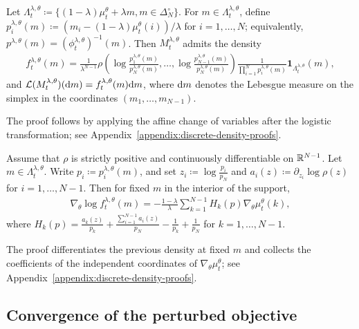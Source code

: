 \begin{proposition}
    Let $\Lambda_t^{\lambda,\theta}\coloneqq \{(1-\lambda)\mu_t^\theta+\lambda m, m\in\Delta_N^\circ\}$. For $m\in\Lambda_t^{\lambda,\theta}$, define $p_i^{\lambda,\theta}(m)\coloneqq (m_i - (1-\lambda)\mu_t^\theta(i))/\lambda$ for $i=1,\ldots,N$; equivalently, $p^{\lambda,\theta}(m)=(\phi_t^{\lambda,\theta})^{-1}(m)$. Then $M_t^{\lambda,\theta}$ admits the density
    \begin{align}
        f_t^{\lambda,\theta}(m)
        = \frac{1}{\lambda^{N-1}}
        \rho\left(\log\frac{p_1^{\lambda,\theta}(m)}{p_N^{\lambda,\theta}(m)},\ldots,\log\frac{p_{N-1}^{\lambda,\theta}(m)}{p_N^{\lambda,\theta}(m)} \right)
        \frac{1}{\prod_{i=1}^N p_i^{\lambda,\theta}(m)}
        \mathbf 1_{\Lambda_t^{\lambda,\theta}}(m),
    \end{align}
    and ${\cal L}(M_t^{\lambda,\theta})(\mathrm{d} m) = f_t^{\lambda,\theta}(m)\mathrm{d} m$, where $\mathrm{d} m$ denotes the Lebesgue measure on the simplex in the coordinates $(m_1,\ldots,m_{N-1})$.
\end{proposition}

The proof follows by applying the affine change of variables after the logistic transformation; see Appendix~\ref{appendix:discrete-density-proofs}.

\begin{corollary}
    \label{corollary:discrete-score-density}
    Assume that $\rho$ is strictly positive and continuously differentiable on $\mathbb{R}^{N-1}$. Let $m\in\Lambda_t^{\lambda,\theta}$. Write $p_i\coloneqq p_i^{\lambda,\theta}(m)$, and set $z_i\coloneqq \log\frac{p_i}{p_N}$ and $a_i(z)\coloneqq\partial_{z_i}\log\rho(z)$ for $i=1,\ldots,N-1$. Then for fixed $m$ in the interior of the support,
    \begin{align}
        \nabla_\theta \log f_t^{\lambda,\theta}(m) = -\frac{1-\lambda}{\lambda}\sum_{k=1}^{N-1} H_k(p) \nabla_\theta \mu_t^\theta(k),
    \end{align}
    where $H_k(p) = \frac{a_k(z)}{p_k} + \frac{\sum_{i=1}^{N-1} a_i(z)}{p_N} - \frac{1}{p_k} + \frac{1}{p_N}$ for $k=1,\ldots,N-1$.
\end{corollary}

The proof differentiates the previous density at fixed $m$ and collects the coefficients of the independent coordinates of $\nabla_\theta\mu_t^\theta$; see Appendix~\ref{appendix:discrete-density-proofs}.

\subsection{Convergence of the perturbed objective}

